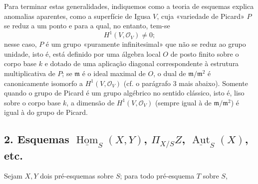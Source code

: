 Para terminar estas generalidades, indiquemos como a teoria de esquemas
explica anomalias aparentes, como a superfície de Igusa $V$, cuja «variedade
de Picard» $P$ se reduz a um ponto e para a qual, no entanto, tem-se
\[
  H^1(V,\mathcal O_V)\ne 0 ;
\]
nesse caso, $P$ é um grupo «puramente infinitesimal» que não se reduz ao
grupo unidade, isto é, está definido por uma álgebra local $O$ de posto finito
sobre o corpo base $k$ e dotado de uma aplicação diagonal correspondente à
estrutura multiplicativa de $P$; se $\mathfrak m$ é o ideal maximal de
$O$, o dual de $\mathfrak m/\mathfrak m^2$ é canonicamente isomorfo a
$H^1(V,\mathcal O_V)$ (cf. o parágrafo 3 mais abaixo). Somente quando o grupo de
Picard é um grupo algébrico no sentido clássico, isto é, liso sobre o
corpo base $k$, a dimensão de $H^1(V,\mathcal O_V)$ (sempre igual à de
$\mathfrak m/\mathfrak m^2$) é igual à do grupo de Picard.

\subsection*{2. Esquemas $\underline{\operatorname{Hom}}_S(X,Y)$,
$\Pi_{X/S}Z$, $\underline{\operatorname{Aut}}_S(X)$, etc.}

Sejam $X,Y$ dois pré-esquemas sobre $S$; para todo pré-esquema $T$ sobre $S$,

